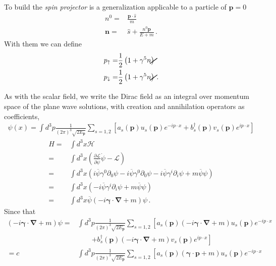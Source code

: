 \begin{frame}
To build the \emph{spin projector} is a generalization applicable to a
particle of $\mathbf{p}=0$
\begin{align*}
  n^0       =&\frac{\mathbf{p}\cdot\hat{s}}{m}\nonumber\\
  \mathbf{n}=&\hat{s}+\frac{n^0\mathbf{p}}{E+m}\,.
\end{align*}
With them we can define
\begin{align*}
  p_{\uparrow}=&\frac{1}{2} \left(1+\gamma^5\cancel{n}  \right)\nonumber\\
  p_{\downarrow}=&\frac{1}{2} \left(1+\gamma^5\cancel{n}  \right)\,.
\end{align*}



As with the scalar field, we write the Dirac field as an integral over momentum space of the plane wave solutions, with creation and annihilation operators as coefficients,
\begin{align}
  \psi(x)=\int d^3p\frac{1}{(2\pi)^3\sqrt{2 E_{\mathbf{p}}}}\sum_{s=1,2}\left[a_s(\mathbf{p})u_s(\mathbf{p})e^{-i p\cdot x}
+b_s^\dagger(\mathbf{p})v_s(\mathbf{p})e^{i p\cdot x}\right]
\end{align}
\begin{align}
  H=&\int d^3x \mathcal{H}\nonumber\\
=&\int d^3x\left(\frac{\partial \mathcal{L}}{\partial\dot\psi}\dot\psi -\mathcal{L}\right)\nonumber\\
  =&\int d^3x\left(i\overline{\psi}\gamma^0\partial_0\psi
-i\overline{\psi}\gamma^0\partial_0\psi-i\overline{\psi}\gamma^i\partial_i\psi+m\overline{\psi}\psi\right)\nonumber\\
 =&\int d^3x\left(-i\overline{\psi}\gamma^i\partial_i\psi+m\overline{\psi}\psi\right)\nonumber\\
 =&\int d^3x\overline{\psi}\left(-i\boldsymbol{\gamma}\cdot\boldsymbol{\nabla}+m\right)\psi\,.
\end{align}
Since that
\begin{align}
\label{eq:180}
  \left(-i\boldsymbol{\gamma}\cdot\boldsymbol{\nabla}+m\right)\psi=&
\int d^3p\frac{1}{(2\pi)^3\sqrt{2 E_{\mathbf{p}}}}\sum_{s=1,2}\left[a_s(\mathbf{p})\left(-i\boldsymbol{\gamma}\cdot\boldsymbol{\nabla}+m\right)u_s(\mathbf{p})e^{-i p\cdot x}\right.\nonumber\\
&\qquad\left.+b_s^\dagger(\mathbf{p})\left(-i\boldsymbol{\gamma}\cdot\boldsymbol{\nabla}+m\right)v_s(\mathbf{p})e^{i p\cdot x}\right]\nonumber\\
=c&\int d^3p\frac{1}{(2\pi)^3\sqrt{2 E_{\mathbf{p}}}}\sum_{s=1,2}\left[a_s(\mathbf{p})\left(\boldsymbol{\gamma}\cdot\mathbf{p}+m\right)u_s(\mathbf{p})e^{-i p\cdot x}\right.\nonumber\\

\end{align}
\end{frame}
